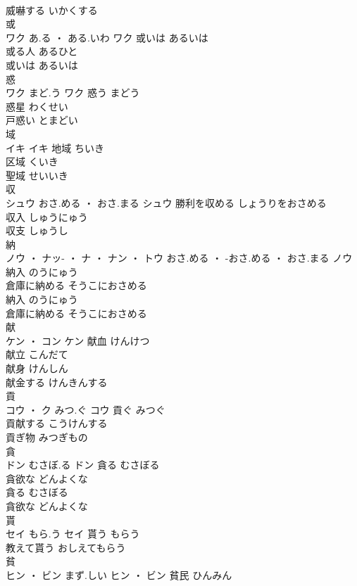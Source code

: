 \documentclass[8pt]{extreport}
\begin{document}
\begin{CJK}{UTF8}{min}
\\	威嚇する	いかくする	
\\	或	
\\	ワク	あ.る ・ ある.いわ	ワク	或いは	あるいは	
\\	或る人	あるひと	
\\	或いは	あるいは	
\\	惑	
\\	ワク	まど.う	ワク	惑う	まどう	
\\	惑星	わくせい	
\\	戸惑い	とまどい	
\\	域	
\\	イキ		イキ	地域	ちいき	
\\	区域	くいき	
\\	聖域	せいいき	
\\	収	
\\	シュウ	おさ.める ・ おさ.まる	シュウ	勝利を収める	しょうりをおさめる	
\\	収入	しゅうにゅう	
\\	収支	しゅうし	
\\	納	
\\	ノウ ・ ナッ- ・ ナ ・ ナン ・ トウ	おさ.める ・ -おさ.める ・ おさ.まる	ノウ	納入	のうにゅう	
\\	倉庫に納める	そうこにおさめる	
\\	納入	のうにゅう	
\\	倉庫に納める	そうこにおさめる	
\\	献	
\\	ケン ・ コン		ケン	献血	けんけつ	
\\	献立	こんだて	
\\	献身	けんしん	
\\	献金する	けんきんする	
\\	貢	
\\	コウ ・ ク	みつ.ぐ	コウ	貢ぐ	みつぐ	
\\	貢献する	こうけんする	
\\	貢ぎ物	みつぎもの	
\\	貪	
\\	ドン	むさぼ.る	ドン	貪る	むさぼる	
\\	貪欲な	どんよくな	
\\	貪る	むさぼる	
\\	貪欲な	どんよくな	
\\	貰	
\\	セイ	もら.う	セイ	貰う	もらう	
\\	教えて貰う	おしえてもらう	
\\	貧	
\\	ヒン ・ ビン	まず.しい	ヒン ・ ビン	貧民	ひんみん	

\end{CJK}
\end{document}
